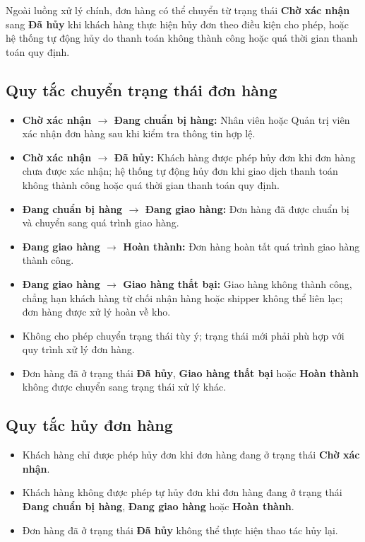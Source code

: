 Ngoài luồng xử lý chính, đơn hàng có thể chuyển từ trạng thái \textbf{Chờ xác nhận} sang \textbf{Đã hủy} khi khách hàng thực hiện hủy đơn theo điều kiện cho phép, hoặc hệ thống tự động hủy do thanh toán không thành công hoặc quá thời gian thanh toán quy định.

\subsection{Quy tắc chuyển trạng thái đơn hàng}

\begin{itemize}
\item \textbf{Chờ xác nhận $\rightarrow$ Đang chuẩn bị hàng:} Nhân viên hoặc Quản trị viên xác nhận đơn hàng sau khi kiểm tra thông tin hợp lệ.

\item \textbf{Chờ xác nhận $\rightarrow$ Đã hủy:} Khách hàng được phép hủy đơn khi đơn hàng chưa được xác nhận; hệ thống tự động hủy đơn khi giao dịch thanh toán không thành công hoặc quá thời gian thanh toán quy định.

\item \textbf{Đang chuẩn bị hàng $\rightarrow$ Đang giao hàng:} Đơn hàng đã được chuẩn bị và chuyển sang quá trình giao hàng.

\item \textbf{Đang giao hàng $\rightarrow$ Hoàn thành:} Đơn hàng hoàn tất quá trình giao hàng thành công.

\item \textbf{Đang giao hàng $\rightarrow$ Giao hàng thất bại:} Giao hàng không thành công, chẳng hạn khách hàng từ chối nhận hàng hoặc shipper không thể liên lạc; đơn hàng được xử lý hoàn về kho.

\item Không cho phép chuyển trạng thái tùy ý; trạng thái mới phải phù hợp với quy trình xử lý đơn hàng.

\item Đơn hàng đã ở trạng thái \textbf{Đã hủy}, \textbf{Giao hàng thất bại} hoặc \textbf{Hoàn thành} không được chuyển sang trạng thái xử lý khác.
\end{itemize}
\subsection{Quy tắc hủy đơn hàng}
\begin{itemize}
    \item Khách hàng chỉ được phép hủy đơn khi đơn hàng đang ở trạng thái \textbf{Chờ xác nhận}.
    \item Khách hàng không được phép tự hủy đơn khi đơn hàng đang ở trạng thái \textbf{Đang chuẩn bị hàng}, \textbf{Đang giao hàng} hoặc \textbf{Hoàn thành}.
    \item Đơn hàng đã ở trạng thái \textbf{Đã hủy} không thể thực hiện thao tác hủy lại.
\end{itemize}

